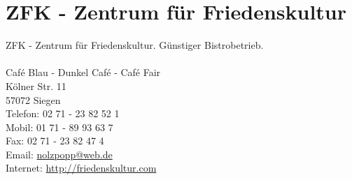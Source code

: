 \section{ZFK - Zentrum für Friedenskultur}
ZFK - Zentrum für Friedenskultur. Günstiger Bistrobetrieb.\\
\\
Café Blau - Dunkel Café - Café Fair \\
Kölner Str. 11 \\
57072 Siegen \\
Telefon: 02 71 - 23 82 52 1\\
Mobil: 01 71 - 89 93 63 7\\ 
Fax: 02 71 - 23 82 47 4\\  
Email: \href{mailto:nolzpopp@web.de}{nolzpopp@web.de} \\ 
Internet: \href{http://friedenskultur.com}{http://friedenskultur.com}
